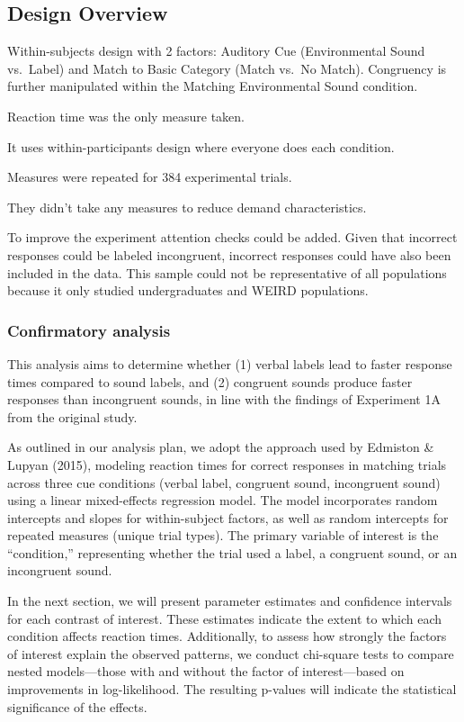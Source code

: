 \documentclass[
  letterpaper,
  DIV=11,
  numbers=noendperiod]{scrartcl}
\begin{document}
\subsection{Design Overview}\label{design-overview}

Within-subjects design with 2 factors: Auditory Cue (Environmental Sound
vs.~Label) and Match to Basic Category (Match vs.~No Match). Congruency
is further manipulated within the Matching Environmental Sound
condition.

Reaction time was the only measure taken.

It uses within-participants design where everyone does each condition.

Measures were repeated for 384 experimental trials.

They didn't take any measures to reduce demand characteristics.

To improve the experiment attention checks could be added. Given that
incorrect responses could be labeled incongruent, incorrect responses
could have also been included in the data. This sample could not be
representative of all populations because it only studied undergraduates
and WEIRD populations.

\subsubsection{Confirmatory analysis}\label{confirmatory-analysis}

This analysis aims to determine whether (1) verbal labels lead to faster
response times compared to sound labels, and (2) congruent sounds
produce faster responses than incongruent sounds, in line with the
findings of Experiment 1A from the original study.

As outlined in our analysis plan, we adopt the approach used by Edmiston
\& Lupyan (2015), modeling reaction times for correct responses in
matching trials across three cue conditions (verbal label, congruent
sound, incongruent sound) using a linear mixed-effects regression model.
The model incorporates random intercepts and slopes for within-subject
factors, as well as random intercepts for repeated measures (unique
trial types). The primary variable of interest is the ``condition,''
representing whether the trial used a label, a congruent sound, or an
incongruent sound.

In the next section, we will present parameter estimates and confidence
intervals for each contrast of interest. These estimates indicate the
extent to which each condition affects reaction times. Additionally, to
assess how strongly the factors of interest explain the observed
patterns, we conduct chi-square tests to compare nested models---those
with and without the factor of interest---based on improvements in
log-likelihood. The resulting p-values will indicate the statistical
significance of the effects.
\end{document}
